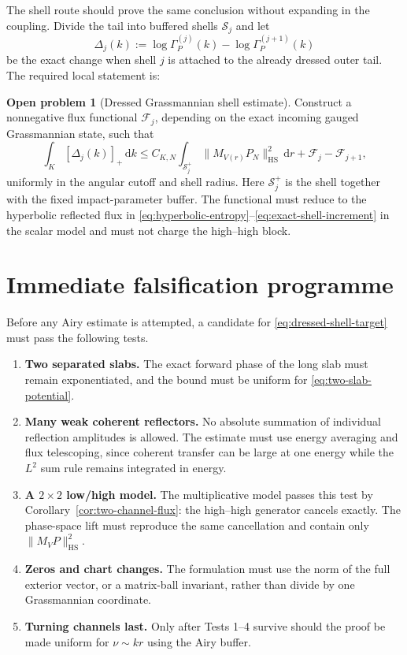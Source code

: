 \documentclass[11pt]{article}
\newcommand{\dd}{\,\mathrm d}
\newcommand{\cF}{\mathcal F}
\newcommand{\cS}{\mathcal S}
\newcommand{\HS}{\mathrm{HS}}
\theoremstyle{definition}
\newtheorem{problem}[proposition]{Open problem}
\begin{document}
The shell route should prove the same conclusion without expanding in the
coupling.  Divide the tail into buffered shells $\cS_j$ and let
\begin{equation}
 \Delta_j(k)
 :=\log\Gamma_P^{(j)}(k)-\log\Gamma_P^{(j+1)}(k)
 \label{eq:relative-shell-increment}
\end{equation}
be the exact change when shell $j$ is attached to the already dressed outer
tail.  The required local statement is:
\begin{problem}[Dressed Grassmannian shell estimate]
\label{prob:dressed-shell}
Construct a nonnegative flux functional $\cF_j$, depending on the exact
incoming gauged Grassmannian state, such that
\begin{equation}
 \int_K[\Delta_j(k)]_+\dd k
 \leq C_{K,N}\int_{\cS_j^+}
 \|M_{V(r)}P_N\|_{\HS}^2\dd r
 +\cF_j-\cF_{j+1},
 \label{eq:dressed-shell-target}
\end{equation}
uniformly in the angular cutoff and shell radius.  Here $\cS_j^+$ is the
shell together with the fixed impact-parameter buffer.  The functional must
reduce to the hyperbolic reflected flux in
\eqref{eq:hyperbolic-entropy}--\eqref{eq:exact-shell-increment} in the scalar
model and must not charge the high--high block.
\end{problem}

\section{Immediate falsification programme}

Before any Airy estimate is attempted, a candidate for
\eqref{eq:dressed-shell-target} must pass the following tests.
\begin{enumerate}[label=\textbf{Test \arabic*.},leftmargin=*]
 \item \textbf{Two separated slabs.}  The exact forward phase of the long
 slab must remain exponentiated, and the bound must be uniform for
 \eqref{eq:two-slab-potential}.
 \item \textbf{Many weak coherent reflectors.}  No absolute summation of
 individual reflection amplitudes is allowed.  The estimate must use energy
 averaging and flux telescoping, since coherent transfer can be large at one
 energy while the $L^2$ sum rule remains integrated in energy.
 \item \textbf{A $2\times2$ low/high model.}  The multiplicative model passes
 this test by Corollary~\ref{cor:two-channel-flux}: the high--high generator
 cancels exactly.  The phase-space lift must reproduce the same cancellation
 and contain only $\|M_VP\|_{\HS}^2$.
 \item \textbf{Zeros and chart changes.}  The formulation must use the norm
 of the full exterior vector, or a matrix-ball invariant, rather than divide
 by one Grassmannian coordinate.
 \item \textbf{Turning channels last.}  Only after Tests 1--4 survive should
 the proof be made uniform for $\nu\sim kr$ using the Airy buffer.
\end{enumerate}
\end{document}
